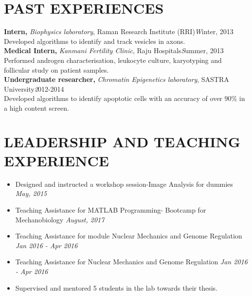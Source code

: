 \documentclass[letterpaper,11pt]{article}
\begin{document}
\section{\bf PAST EXPERIENCES}
{\bf Intern, }{\emph{Biophysics laboratory}}{, Raman Research Institute (RRI)}\hfill {\emph Winter, 2013} \\
\hspace*{5ex}Developed algorithms to identify and track vesicles in axons.\\
{\bf Medical Intern, }{\emph {Kanmani Fertility Clinic}, Raju Hospitals}\hfill {\emph Summer, 2013} \\
\hspace*{5ex} Performed androgen characterisation, leukocyte culture, karyotyping and follicular study on patient samples.\\
{\bf Undergraduate researcher, }{\emph{Chromatin Epigenetics laboratory}}{, SASTRA University}\hfill {\emph 2012-2014} \\
\hspace*{5ex}Developed algorithms to identify apoptotic cells with an accuracy of over 90\% in a high content screen.

\vspace{1mm}
\section{\bf LEADERSHIP AND TEACHING EXPERIENCE}
\begin{itemize}
    \item Designed and instructed a workshop session-Image Analysis for dummies  \hfill \emph {May, 2015}
    \item Teaching Assistance for MATLAB Programming- Bootcamp for Mechanobiology \hfill \emph {August, 2017} 
    \item Teaching Assistance for module Nuclear Mechanics and Genome Regulation \hfill \emph{Jan 2016 - Apr 2016} 
    \item Teaching Assistance for Nuclear Mechanics and Genome Regulation \hfill \emph{Jan 2016 - Apr 2016}
     \item Supervised and mentored 5 students in the lab towards their thesis.
\end{itemize}


\vspace{1mm}
\end{document}
